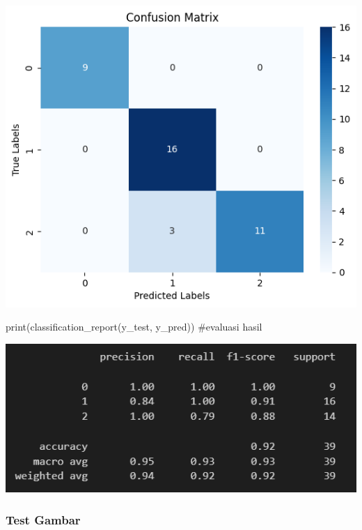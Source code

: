 \documentclass[
  letterpaper,
  DIV=11,
  numbers=noendperiod]{scrreprt}
\newenvironment{Shaded}{\begin{snugshade}}{\end{snugshade}}
\newcommand{\BuiltInTok}[1]{\textcolor[rgb]{0.00,0.23,0.31}{#1}}
\newcommand{\CommentTok}[1]{\textcolor[rgb]{0.37,0.37,0.37}{#1}}
\newcommand{\NormalTok}[1]{\textcolor[rgb]{0.00,0.23,0.31}{#1}}
\begin{document}
\includegraphics{Asset/confusion_sift_knn.png}

\begin{Shaded}
\begin{Highlighting}[]
\BuiltInTok{print}\NormalTok{(classification\_report(y\_test, y\_pred)) }\CommentTok{\#evaluasi hasil}
\end{Highlighting}
\end{Shaded}

\includegraphics{Asset/classreport_sift_knn.png}

\hypertarget{test-gambar}{%
\subsubsection*{Test Gambar}\label{test-gambar}}
\end{document}
